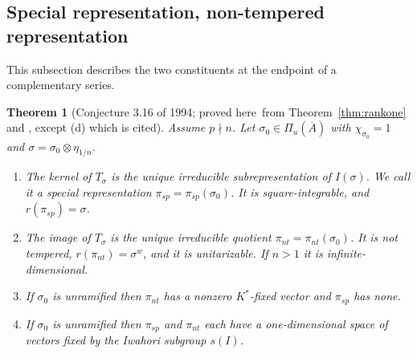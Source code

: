 \documentclass[12pt,letterpaper]{article}
\numberwithin{equation}{section}
\newtheorem{theorem}{Theorem}[section]
\theoremstyle{definition}
\newcommand{\proved}{proved here}
\newcommand{\cited}{cited}
\newcommand{\bA}{\overline{A}}
\begin{document}
\subsection{Special representation, non-tempered representation}\label{subsec:special}

This subsection describes the two constituents at the endpoint of a complementary series.

\begin{theorem}[Conjecture 3.16 of 1994; \proved\ from Theorem~\ref{thm:rankone} and
\cite{BJ13}, except (d) which is \cited]\label{thm:special}
Assume $p\nmid n$.  Let $\sigma_0\in\Pi_u(\bA)$ with $\chi_{\sigma_0}=1$ and
$\sigma=\sigma_0\otimes\eta_{1/n}$.
\begin{enumerate}[label=(\alph*),leftmargin=*,itemsep=1pt]
\item The kernel of $T_\sigma$ is the unique irreducible subrepresentation of $I(\sigma)$.
We call it a \emph{special representation} $\pi_{sp}=\pi_{sp}(\sigma_0)$.  It is
square-integrable, and $r(\pi_{sp})=\sigma$.
\item The image of $T_\sigma$ is the unique irreducible quotient
$\pi_{nt}=\pi_{nt}(\sigma_0)$.  It is not tempered, $r(\pi_{nt})=\sigma^w$, and it is
unitarizable.  If $n>1$ it is infinite-dimensional.
\item If $\sigma_0$ is unramified then $\pi_{nt}$ has a nonzero $K^*$-fixed vector and
$\pi_{sp}$ has none.
\item If $\sigma_0$ is unramified then $\pi_{sp}$ and $\pi_{nt}$ each have a
one-dimensional space of vectors fixed by the Iwahori subgroup $s(I)$.
\end{enumerate}
\end{theorem}
\end{document}
